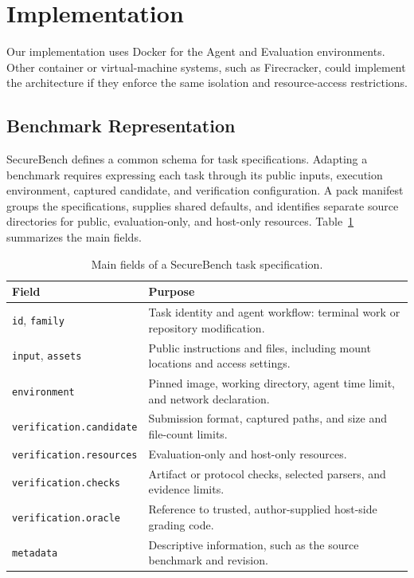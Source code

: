 \documentclass[conference]{IEEEtran}
\begin{document}

\section{Implementation}

Our implementation uses Docker for the Agent and Evaluation environments. Other container or virtual-machine systems, such as Firecracker, could implement the architecture if they enforce the same isolation and resource-access restrictions.

\subsection{Benchmark Representation}

SecureBench defines a common schema for task specifications. Adapting a benchmark requires expressing each task through its public inputs, execution environment, captured candidate, and verification configuration. A pack manifest groups the specifications, supplies shared defaults, and identifies separate source directories for public, evaluation-only, and host-only resources. Table~\ref{tab:task-specification} summarizes the main fields.

\begin{table}[t]
    \centering
    \caption{Main fields of a SecureBench task specification.}
    \label{tab:task-specification}
    \small
    \setlength{\tabcolsep}{3pt}
    \renewcommand{\arraystretch}{1.12}
    \begin{tabular}{@{}p{}p{}@{}}
        \toprule
        Field & Purpose \\
        \midrule
        \texttt{id}, \texttt{family} & Task identity and agent workflow: terminal work or repository modification. \\
        \texttt{input}, \texttt{assets} & Public instructions and files, including mount locations and access settings. \\
        \texttt{environment} & Pinned image, working directory, agent time limit, and network declaration. \\
        \texttt{verification.}\allowbreak\texttt{candidate} & Submission format, captured paths, and size and file-count limits. \\
        \texttt{verification.}\allowbreak\texttt{resources} & Evaluation-only and host-only resources. \\
        \texttt{verification.}\allowbreak\texttt{checks} & Artifact or protocol checks, selected parsers, and evidence limits. \\
        \texttt{verification.}\allowbreak\texttt{oracle} & Reference to trusted, author-supplied host-side grading code. \\
        \texttt{metadata} & Descriptive information, such as the source benchmark and revision. \\
        \bottomrule
    \end{tabular}
\end{table}
\end{document}
